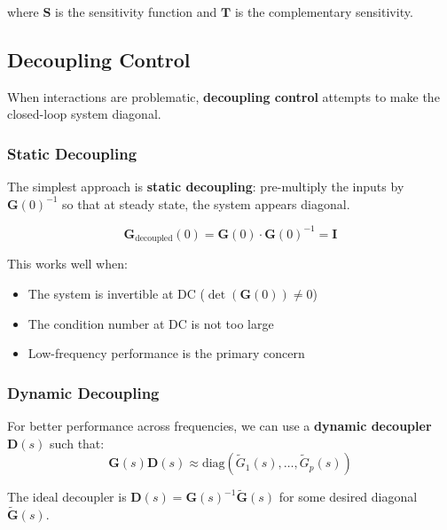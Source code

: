 where $\mathbf{S}$ is the sensitivity function and $\mathbf{T}$ is the complementary sensitivity.

\subsection{Decoupling Control}

When interactions are problematic, \textbf{decoupling control} attempts to make the closed-loop system diagonal.

\subsubsection{Static Decoupling}

The simplest approach is \textbf{static decoupling}: pre-multiply the inputs by $\mathbf{G}(0)^{-1}$ so that at steady state, the system appears diagonal.

\begin{equation}
\mathbf{G}_{\text{decoupled}}(0) = \mathbf{G}(0) \cdot \mathbf{G}(0)^{-1} = \mathbf{I}
\end{equation}

This works well when:
\begin{itemize}
\item The system is invertible at DC ($\det(\mathbf{G}(0)) \neq 0$)
\item The condition number at DC is not too large
\item Low-frequency performance is the primary concern
\end{itemize}

\subsubsection{Dynamic Decoupling}

For better performance across frequencies, we can use a \textbf{dynamic decoupler} $\mathbf{D}(s)$ such that:
\begin{equation}
\mathbf{G}(s)\mathbf{D}(s) \approx \text{diag}(\tilde{G}_1(s), \ldots, \tilde{G}_p(s))
\end{equation}

The ideal decoupler is $\mathbf{D}(s) = \mathbf{G}(s)^{-1}\tilde{\mathbf{G}}(s)$ for some desired diagonal $\tilde{\mathbf{G}}(s)$.



